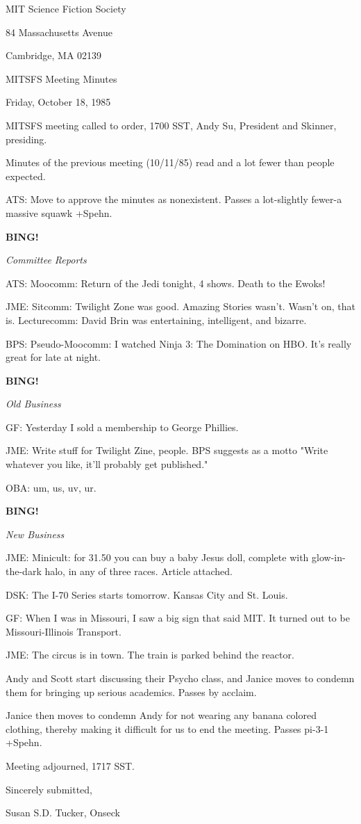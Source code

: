 \documentclass[12pt]{article}
\newcommand{\bing}{{\bf BING!} }
\newcommand{\goto}[1]{\bing \vskip 12pt \centerline{{\em{#1}}}}
\begin{document}
\begin{center}

MIT Science Fiction Society 

84 Massachusetts Avenue

Cambridge, MA 02139

\vspace{12pt}

MITSFS Meeting Minutes 

Friday, October 18, 1985

\end{center}
 
\vspace{18pt}

\setlength{\parskip}{6pt}

\noindent
MITSFS meeting called to order, 1700 SST,
Andy Su, President and Skinner, presiding.

Minutes of the previous meeting (10/11/85) read and a lot fewer than people expected.

ATS: Move to approve the minutes as nonexistent. Passes a lot-slightly fewer-a massive squawk +Spehn.

\goto{Committee Reports}

ATS: Moocomm: Return of the Jedi tonight, 4 shows. Death to the Ewoks!

JME: Sitcomm: Twilight Zone was good. Amazing Stories wasn't. Wasn't on, that is. Lecturecomm: David Brin was entertaining, intelligent, and bizarre.

BPS: Pseudo-Moocomm: I watched Ninja 3: The Domination on HBO. It's really great for late at night.

\goto{Old Business}

GF: Yesterday I sold a membership to George Phillies.

JME: Write stuff for Twilight Zine, people. BPS suggests as a motto "Write whatever you like, it'll probably get published."

OBA: um, us, uv, ur.

\goto{New Business}

JME: Minicult: for 31.50 you can buy a baby Jesus doll, complete with glow-in-the-dark halo, in any of three races. Article attached.

DSK: The I-70 Series starts tomorrow. Kansas City and St. Louis.

GF: When I was in Missouri, I saw a big sign that said MIT. It turned out to be Missouri-Illinois Transport.

JME: The circus is in town. The train is parked behind the reactor.

Andy and Scott start discussing their Psycho class, and Janice moves to condemn them for bringing up serious academics. Passes by acclaim.

Janice then moves to condemn Andy for not wearing any banana colored clothing, thereby making it difficult for us to end the meeting. Passes pi-3-1 +Spehn.

\vspace{12pt}

\noindent
Meeting adjourned, 1717 SST.

\vspace{18pt}

\centerline{Sincerely submitted,}
\centerline{Susan S.D. Tucker, Onseck}
\end{document}
